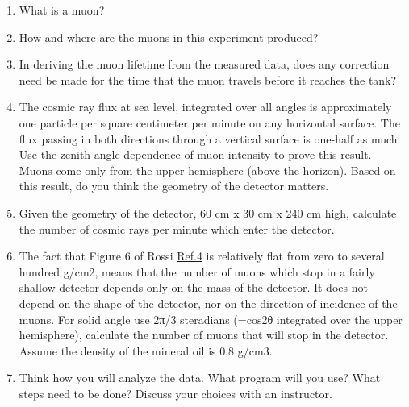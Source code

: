 \documentclass{../signatures}
\begin{document}
\maketitle

\names

\prelab

\begin{enumerate}

    \item What is a muon?
    
    \item How and where are the muons in this experiment produced?

    \item In deriving the muon lifetime from the measured data, does any correction need be made for the time that the muon travels before it reaches the tank?

    \item The cosmic ray flux at sea level, integrated over all angles is approximately one particle per square centimeter per minute on any horizontal surface. The flux passing in both directions through a vertical surface is one-half as much. Use the zenith angle dependence of muon intensity to prove this result. Muons come only from the upper hemisphere (above the horizon). Based on this result, do you think the geometry of the detector matters.

    \item Given the geometry of the detector, 60 cm x 30 cm x 240 cm high, calculate the number of cosmic rays per minute which enter the detector.
    
    \item The fact that Figure 6 of Rossi \href{http://physics111.lib.berkeley.edu/Physics111/Reprints/MUO/02-Cosmic-Ray\_Phenomena.pdf}{Ref.4} is relatively flat from zero to several hundred g/cm2, means that the number of muons which stop in a fairly shallow detector depends only on the mass of the detector. It does not depend on the shape of the detector, nor on the direction of incidence of the muons. For solid angle use 2π/3 steradians (=cos2θ integrated over the upper hemisphere), calculate the number of muons that will stop in the detector. Assume the density of the mineral oil is 0.8 g/cm3.

    \item Think how you will analyze the data. What program will you use? What steps need to be done? Discuss your choices with an instructor.
       \\[36pt]
\end{enumerate}
\end{document}

